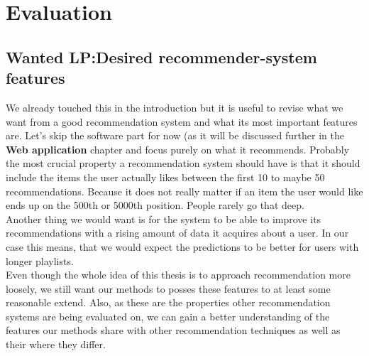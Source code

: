
\section{Evaluation}

\subsection{Wanted LP:Desired recommender-system features}
We already touched this in the introduction but it is useful to revise what we want from a good recommendation system and what its most important features are. Let's skip the software part for now (as it will be discussed further in the \textbf{Web application} chapter and focus purely on what it recommends. Probably the most crucial property a recommendation system should have is that it should include the items the user actually likes between the first 10 to maybe 50 recommendations. Because it does not really matter if an item the user would like ends up on the 500th or 5000th position. People rarely go that deep. \\
Another thing we would want is for the system to be able to improve its recommendations with a rising amount of data it acquires about a user. In our case this means, that we would expect the predictions to be better for users with longer playlists. \\
Even though the whole idea of this thesis is to approach recommendation more loosely, we still want our methods to posses these features to at least some reasonable extend. Also, as these are the properties other recommendation systems are being evaluated on, we can gain a better understanding of the features our methods share with other recommendation techniques as well as their where they differ. 
